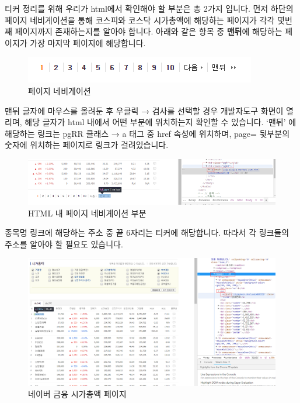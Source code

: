 \documentclass[]{book}
\begin{document}
티커 정리를 위해 우리가 html에서 확인해야 할 부분은 총 2가지 입니다. 먼저 하단의 페이지 네비게이션을 통해 코스피와 코스닥 시가총액에 해당하는 페이지가 각각 몇번째 페이지까지 존재하는지를 알아야 합니다. 아래와 같은 항목 중 \textbf{맨뒤}에 해당하는 페이지가 가장 마지막 페이지에 해당합니다.

\begin{figure}

{\centering \includegraphics[width=0.7\linewidth]{images/crawl_page_navi} 

}

\caption{페이지 네비게이션}\label{fig:unnamed-chunk-16}
\end{figure}

맨뒤 글자에 마우스를 올려둔 후 우클릭 → 검사를 선택할 경우 개발자도구 화면이 열리며, 해당 글자가 html 내에서 어떤 부분에 위치하는지 확인할 수 있습니다. `맨뒤' 에 해당하는 링크는 pgRR 클래스 → a 태그 중 href 속성에 위치하며, page= 뒷부분의 숫자에 위치하는 페이지로 링크가 걸려있습니다.

\begin{figure}

{\centering \includegraphics[width=1\linewidth]{images/crawl_page_navi2} 

}

\caption{HTML 내 페이지 네비게이션 부분}\label{fig:unnamed-chunk-17}
\end{figure}

종목명 링크에 해당하는 주소 중 끝 6자리는 티커에 해당합니다. 따라서 각 링크들의 주소를 알아야 할 필요도 있습니다.

\begin{figure}

{\centering \includegraphics[width=1\linewidth]{images/crawl_naver_corp} 

}

\caption{네이버 금융 시가총액 페이지}\label{fig:unnamed-chunk-18}
\end{figure}
\end{document}
